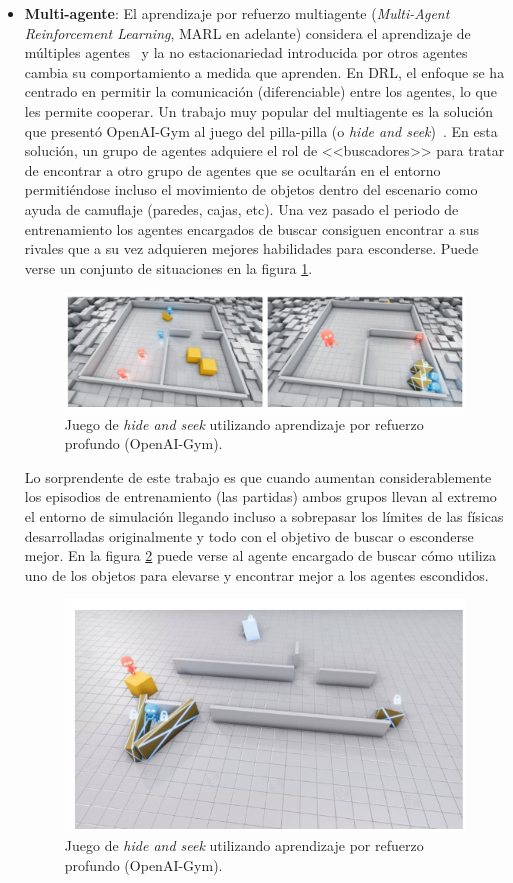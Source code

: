 \begin{itemize}
    \item \textbf{Multi-agente}: El aprendizaje por refuerzo multiagente (\textit{Multi-Agent Reinforcement Learning}, MARL en adelante) considera el aprendizaje de múltiples agentes~\cite{nando_de_freitas} y la no estacionariedad introducida por otros agentes cambia su comportamiento a medida que aprenden. En DRL, el enfoque se ha centrado en permitir la comunicación (diferenciable) entre los agentes, lo que les permite cooperar. Un trabajo muy popular del multiagente es la solución que presentó OpenAI-Gym al juego del pilla-pilla (o \textit{hide and seek})~\cite{world_models}. En esta solución, un grupo de agentes adquiere el rol de <<buscadores>> para tratar de encontrar a otro grupo de agentes que se ocultarán en el entorno permitiéndose incluso el movimiento de objetos dentro del escenario como ayuda de camuflaje (paredes, cajas, etc). Una vez pasado el periodo de entrenamiento los agentes encargados de buscar consiguen encontrar a sus rivales que a su vez adquieren mejores habilidades para esconderse. Puede verse un conjunto de situaciones en la figura \ref{fig:multiagente-1}.
    
    \begin{figure}[!ht]
        \centering \includegraphics[width=0.8\columnwidth]{./figures/chapter_2/multiagente-1.png}
        \caption{Juego de \textit{hide and seek} utilizando aprendizaje por refuerzo profundo (OpenAI-Gym).}\label{fig:multiagente-1}
    \end{figure}
    
    Lo sorprendente de este trabajo es que cuando aumentan considerablemente los episodios de entrenamiento (las partidas) ambos grupos llevan al extremo el entorno de simulación llegando incluso a sobrepasar los límites de las físicas desarrolladas originalmente y todo con el objetivo de buscar o esconderse mejor. En la figura \ref{fig:multiagente-2} puede verse al agente encargado de buscar cómo utiliza uno de los objetos para elevarse y encontrar mejor a los agentes escondidos.\\
    
    \begin{figure}[!ht]
        \centering \includegraphics[width=0.5\columnwidth]{./figures/chapter_2/multiagente-2.png}
        \caption{Juego de \textit{hide and seek} utilizando aprendizaje por refuerzo profundo (OpenAI-Gym).}\label{fig:multiagente-2}
    \end{figure}


\end{itemize}
